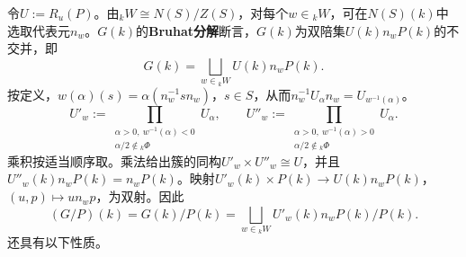 令$U:=R_u(P)$。由${}_kW\cong N(S)/Z(S)$，对每个$w\in{}_kW$，可在$N(S)(k)$中选取代表元$n_w$。$G(k)$的\textbf{Bruhat分解}断言，$G(k)$为双陪集$U(k)n_wP(k)$的不交并，即
\begin{equation}\tag{1.2}\label{L19eq12}G(k)=\bigsqcup_{w\in{}_kW}U(k)n_wP(k).\end{equation}
按定义，$w(\alpha)(s)=\alpha(n_w^{-1}sn_w)$，$s\in S$，从而$n_w^{-1}U_\alpha n_w=U_{w^{-1}(\alpha)}$。
\[
U'_w:=\prod_{\substack{\alpha>0,\ w^{-1}(\alpha)<0\\\alpha/2\notin{}_k\Phi}}U_\alpha,
\qquad
U''_w:=\prod_{\substack{\alpha>0,\ w^{-1}(\alpha)>0\\\alpha/2\notin{}_k\Phi}}U_\alpha.
\]
乘积按适当顺序取。乘法给出簇的同构$U'_w\times U''_w\cong U$，并且$U''_w(k)n_wP(k)=n_wP(k)$。映射$U'_w(k)\times P(k)\to U(k)n_wP(k)$，$(u,p)\mapsto un_wp$，为双射。因此
\begin{equation}\tag{1.3}\label{L19eq13}(G/P)(k)=G(k)/P(k)=\bigsqcup_{w\in{}_kW}U'_w(k)n_wP(k)/P(k).\end{equation}
还具有以下性质。

